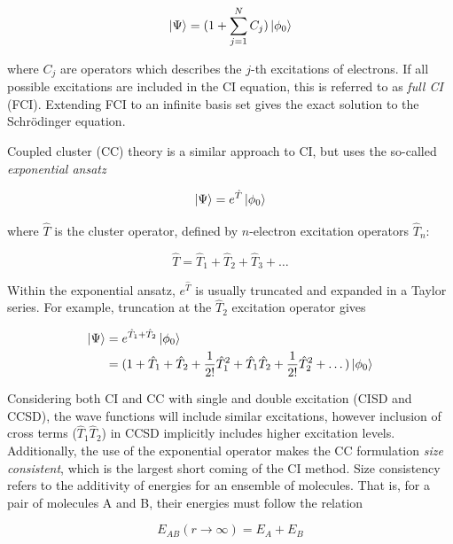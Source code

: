 \begin{equation}
  \ket{\Psi} = (1+\sum_{j=1}^N C_j) \ket{\phi_0}
\end{equation}

\noindent where $C_j$ are operators which describes the $j$-th excitations of electrons. If all possible excitations are included in the CI equation, this is referred to as \emph{full CI} (FCI). Extending FCI to an infinite basis set gives the exact solution to the Schr{\"o}dinger equation.

Coupled cluster (CC) theory\cite{Crawford2000} is a similar approach to CI, but uses the so-called \emph{exponential ansatz}

\begin{equation}
  \ket{\Psi} = e^{\hat{T}}\ket{\phi_0}
\end{equation}

\noindent where $\hat{T}$ is the cluster operator, defined by $n$-electron excitation operators $\hat{T}_n$:

\begin{equation}
  \hat{T} = \hat{T}_1 + \hat{T}_2 + \hat{T}_3 + \dots
\end{equation}

Within the exponential ansatz, $e^{\hat{T}}$ is usually truncated and expanded in a Taylor series. For example, truncation at the $\hat{T}_2$ excitation operator gives

\begin{equation}
\begin{split}
  \ket{\Psi} &= e^{\hat{T}_1+\hat{T}_2}\ket{\phi_0} \\
  &= (1 + \hat{T}_1 + \hat{T}_2 +  \frac{1}{2!}\hat{T}_1^2 + \hat{T}_1\hat{T}_2 + \frac{1}{2!}\hat{T}_2^2 + \dots)
  \ket{\phi_0}
\end{split}
\end{equation}

\noindent Considering both CI and CC with single and double excitation (CISD and CCSD), the wave functions will include similar excitations, however inclusion of cross terms ($\hat{T}_1\hat{T}_2$) in CCSD implicitly includes higher excitation levels. Additionally, the use of the exponential operator makes the CC formulation \emph{size consistent}, which is the largest short coming of the CI method. Size consistency refers to the additivity of energies for an ensemble of molecules. That is, for a pair of molecules A and B, their energies must follow the relation

\begin{equation}
  E_{AB}(r\rightarrow\infty) = E_A + E_B
\end{equation}

